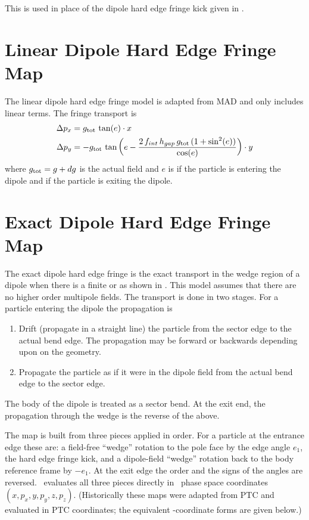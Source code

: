 {This is used in place of the dipole hard edge fringe kick given in .

\section{Linear Dipole Hard Edge Fringe Map}
\label{s:lin.dip.fringe}

The linear dipole hard edge fringe model is adapted from MAD\cite{b:maduser} and only includes linear
terms. The fringe transport is
\begin{align}
  \Delta p_x &= g_{\text{tot}} \, \tan(e) \cdot x \nonumber \\
  \Delta p_y &= -g_{\text{tot}} \, \tan \left( e - 
    \frac{2 \, f_{int} \, h_{gap} \, g_{\text{tot}} \, (1 + \sin^2(e))}{\cos(e)} \right) \cdot y
\end{align}
where $g_{\text{tot}} = g + dg$ is the actual field and $e$ is  if the particle is entering the
dipole and  if the particle is exiting the dipole.

\section{Exact Dipole Hard Edge Fringe Map}
\label{s:exact.dip.fringe}

The exact dipole hard edge fringe is the exact transport in the wedge region of a dipole when there
is a finite  or  as shown in . This model assumes that there are no
higher order multipole fields. The transport is done in two stages. For a particle entering the
dipole the propagation is
\begin{enumerate}
\item
Drift (propagate in a straight line) the particle from the sector edge to the actual bend edge. The
propagation may be forward or backwards depending upon on the geometry.
%
\item
Propagate the particle as if it were in the dipole field from the actual bend edge to the sector
edge.
\end{enumerate}
The body of the dipole is treated as a sector bend. At the exit end, the propagation through the
wedge is the reverse of the above.

The map is built from three pieces applied in order. For a particle at the entrance edge these are:
a field-free ``wedge'' rotation to the pole face by the edge angle $e_1$, the hard edge fringe kick,
and a dipole-field ``wedge'' rotation back to the body reference frame by $-e_1$. At the exit edge
the order and the signs of the angles are reversed. \bmad\ evaluates all three pieces directly in
\bmad\ phase space coordinates $(x, p_x, y, p_y, z, p_z)$. (Historically these maps were adapted from
PTC and evaluated in PTC coordinates; the equivalent \bmad-coordinate forms are given below.)

}
